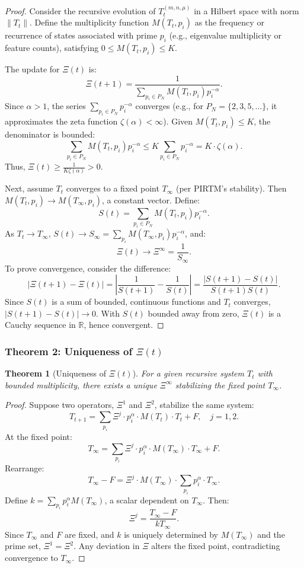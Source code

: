 \documentclass{article}
\theoremstyle{plain}
\newtheorem{theorem}{Theorem}
\begin{document}
\begin{proof}
Consider the recursive evolution of \( T_t^{(m, n, \mu)} \) in a Hilbert space with norm \( \| T_t \| \). Define the multiplicity function \( M(T_t, p_i) \) as the frequency or recurrence of states associated with prime \( p_i \) (e.g., eigenvalue multiplicity or feature counts), satisfying \( 0 \leq M(T_t, p_i) \leq K \).

The update for \(\Xi(t)\) is:
\[
\Xi(t+1) = \frac{1}{\sum_{p_i \in P_N} M(T_t, p_i) p_i^{-\alpha}}.
\]
Since \(\alpha > 1\), the series \(\sum_{p_i \in P_N} p_i^{-\alpha}\) converges (e.g., for \( P_N = \{2, 3, 5, \ldots\} \), it approximates the zeta function \(\zeta(\alpha) < \infty\)). Given \( M(T_t, p_i) \leq K \), the denominator is bounded:
\[
\sum_{p_i \in P_N} M(T_t, p_i) p_i^{-\alpha} \leq K \sum_{p_i \in P_N} p_i^{-\alpha} = K \cdot \zeta(\alpha).
\]
Thus, \(\Xi(t) \geq \frac{1}{K \zeta(\alpha)} > 0\).

Next, assume \( T_t \) converges to a fixed point \( T_\infty \) (per PIRTM’s stability). Then \( M(T_t, p_i) \to M(T_\infty, p_i) \), a constant vector. Define:
\[
S(t) = \sum_{p_i \in P_N} M(T_t, p_i) p_i^{-\alpha}.
\]
As \( T_t \to T_\infty \), \( S(t) \to S_\infty = \sum_{p_i} M(T_\infty, p_i) p_i^{-\alpha} \), and:
\[
\Xi(t) \to \Xi^\infty = \frac{1}{S_\infty}.
\]
To prove convergence, consider the difference:
\[
|\Xi(t+1) - \Xi(t)| = \left| \frac{1}{S(t+1)} - \frac{1}{S(t)} \right| = \frac{|S(t+1) - S(t)|}{S(t+1) S(t)}.
\]
Since \( S(t) \) is a sum of bounded, continuous functions and \( T_t \) converges, \( |S(t+1) - S(t)| \to 0 \). With \( S(t) \) bounded away from zero, \(\Xi(t)\) is a Cauchy sequence in \(\mathbb{R}\), hence convergent.
\end{proof}

\subsubsection{Theorem 2: Uniqueness of \(\Xi(t)\)}
\begin{theorem}[Uniqueness of \(\Xi(t)\)]
For a given recursive system \( T_t \) with bounded multiplicity, there exists a unique \(\Xi^\infty\) stabilizing the fixed point \( T_\infty \).
\end{theorem}

\begin{proof}
Suppose two operators, \(\Xi^1\) and \(\Xi^2\), stabilize the same system:
\[
T_{t+1} = \sum_{p_i} \Xi^j \cdot p_i^\alpha \cdot M(T_t) \cdot T_t + F, \quad j = 1, 2.
\]
At the fixed point:
\[
T_\infty = \sum_{p_i} \Xi^j \cdot p_i^\alpha \cdot M(T_\infty) \cdot T_\infty + F.
\]
Rearrange:
\[
T_\infty - F = \Xi^j \cdot M(T_\infty) \cdot \sum_{p_i} p_i^\alpha \cdot T_\infty.
\]
Define \( k = \sum_{p_i} p_i^\alpha M(T_\infty) \), a scalar dependent on \( T_\infty \). Then:
\[
\Xi^j = \frac{T_\infty - F}{k T_\infty}.
\]
Since \( T_\infty \) and \( F \) are fixed, and \( k \) is uniquely determined by \( M(T_\infty) \) and the prime set, \(\Xi^1 = \Xi^2\). Any deviation in \(\Xi\) alters the fixed point, contradicting convergence to \( T_\infty \).
\end{proof}
\end{document}
